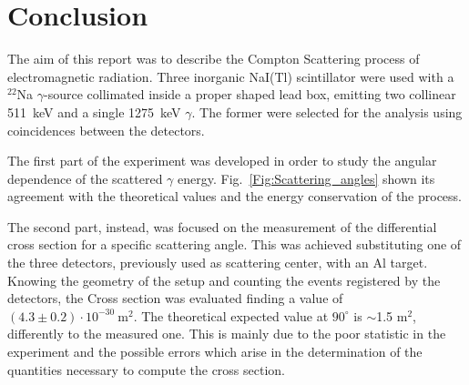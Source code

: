\newpage
\section*{Conclusion}
The aim of this report was to describe the Compton Scattering process of electromagnetic radiation. Three inorganic NaI(Tl) scintillator were used with a $^{22}$Na $\gamma$-source collimated inside a proper shaped lead box,  emitting two collinear 511~keV  and a single 1275~keV $\gamma$. The former were selected for the analysis using coincidences between the detectors.

The first part of the experiment  was developed in order to study the angular dependence of the scattered $\gamma$ energy. Fig.~\ref{Fig:Scattering_angles} shown its agreement with the theoretical values and the energy conservation of the process.

The second part, instead, was focused on the measurement of the differential cross section for a specific scattering angle. This was achieved substituting one of the three detectors, previously used as scattering center, with an Al target. Knowing the geometry of the setup and counting the events registered by the detectors, the Cross section was evaluated finding a value of $(4.3\pm0.2)\cdot 10^{-30}\ \text{m}^{2}$.  The theoretical expected value at $90^\circ$ is $\sim$1.5 m$^2$, differently to the measured one. This is mainly due to the poor statistic in the experiment and the possible errors which arise in the determination of the quantities necessary to compute the cross section.
